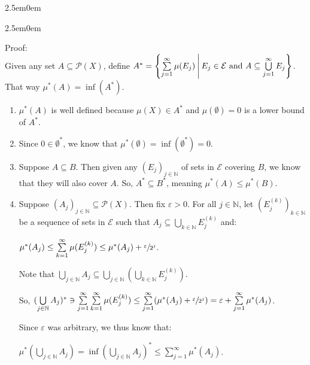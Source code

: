 \documentclass{book}
\newcommand{\hThree}{%
   \color{PineGreen!85!Orange}
   \fontsize{12}{14}\selectfont%
}
\newenvironment{myIndent}{%
   \begin{adjustwidth}{2.5em}{0em}%
}{%
   \end{adjustwidth}%
}
\newcommand{\retTwo}{\hfill\bigbreak}
\begin{document}
\begin{myIndent}
   \begin{myIndent}\hThree
      Proof:\\
      Given any set $A \subseteq \mathcal{P}(X)$, define $A^* = \left\{\sum\limits_{j = 1}^\infty \mu(E_j)\hspace{0.2em} \middle| \hspace{0.2em} E_j \in \mathcal{E} \text{ and } A \subseteq \bigcup\limits_{j = 1}^\infty E_j\right\}$.\\ [-9pt] That way $\mu^*(A) = \inf(A^*)$.
      \begin{enumerate}
         \item $\mu^*(A)$ is well defined because $\mu(X) \in A^*$ and $\mu(\emptyset) = 0$ is a lower bound\\ of $A^*$.\\[ -8pt]
         \item Since $0 \in \emptyset^*$, we know that $\mu^*(\emptyset) = \inf(\emptyset^*) = 0$.\\ [-8pt]
         \item Suppose $A \subseteq B$. Then given any $(E_j)_{j \in \mathbb{N}}$ of sets in $\mathcal{E}$ covering $B$, we know\\ that they will also cover $A$. So, $A^* \subseteq B^*$, meaning $\mu^*(A) \leq \mu^*(B)$.\\ [-8pt]
         \item Suppose $(A_j)_{j \in \mathbb{N}} \subseteq \mathcal{P}(X)$. Then fix $\varepsilon > 0$. For all $j \in \mathbb{N}$, let $(E_j^{(k)})_{k \in \mathbb{N}}$ be a sequence of sets in $\mathcal{E}$ such that $A_j \subseteq \bigcup\limits_{k \in \mathbb{N}}E_j^{(k)}$ and:
         
         {\centering$\mu^*(A_j) \leq \sum\limits_{k = 1}^\infty \mu(E_j^{(k)}) \leq \mu^*(A_j) + \sfrac{\varepsilon}{2^j}$.\retTwo\par}

         Note that $\bigcup\limits_{j \in \mathbb{N}}A_j \subseteq \bigcup\limits_{j \in \mathbb{N}}(\bigcup\limits_{k \in \mathbb{N}}E_j^{(k)})$.\retTwo
         
         So, $(\bigcup\limits_{j \in \mathbb{N}}A_j)^* \ni \sum\limits_{j = 1}^\infty \sum\limits_{k = 1}^\infty\mu(E_j^{(k)}) \leq \sum\limits_{j = 1}^\infty (\mu^*(A_j) + \sfrac{\varepsilon}{2^j}) = \varepsilon + \sum\limits_{j = 1}^\infty \mu^*(A_j)$.\retTwo

         Since $\varepsilon$ was arbitrary, we thus know that:
         
         {\centering $\mu^*(\bigcup\limits_{j \in \mathbb{N}}A_j) = \inf (\bigcup\limits_{j \in \mathbb{N}}A_j)^* \leq \sum\limits_{j = 1}^\infty \mu^*(A_j)$.\retTwo\par}
      \end{enumerate}
   \end{myIndent}
\end{myIndent}
\end{document}
